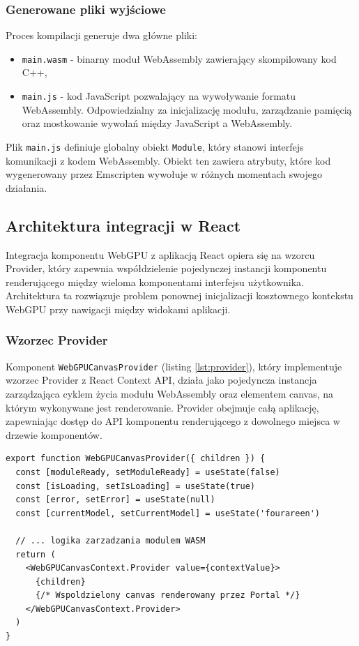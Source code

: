\subsubsection{Generowane pliki wyjściowe}

Proces kompilacji generuje dwa główne pliki:

\begin{itemize}
  \item \texttt{main.wasm} - binarny moduł WebAssembly zawierający skompilowany kod C++,
  \item \texttt{main.js} - kod JavaScript pozwalający na wywoływanie formatu WebAssembly. Odpowiedzialny za inicjalizację modułu, zarządzanie pamięcią oraz mostkowanie wywołań między JavaScript a WebAssembly.
\end{itemize}

Plik \texttt{main.js} definiuje globalny obiekt \texttt{Module}, który stanowi interfejs komunikacji z kodem WebAssembly. Obiekt ten zawiera atrybuty, które kod wygenerowany przez Emscripten wywołuje w różnych momentach swojego działania.

\subsection{Architektura integracji w React}

Integracja komponentu WebGPU z aplikacją React opiera się na wzorcu Provider, który zapewnia współdzielenie pojedynczej instancji komponentu renderującego między wieloma komponentami interfejsu użytkownika. Architektura ta rozwiązuje problem ponownej inicjalizacji kosztownego kontekstu WebGPU przy nawigacji między widokami aplikacji.

\subsubsection{Wzorzec Provider}

Komponent \texttt{WebGPUCanvasProvider} (listing \ref{lst:provider}), który implementuje wzorzec Provider z React Context API, działa jako pojedyncza instancja zarządzająca cyklem życia modułu WebAssembly oraz elementem canvas, na którym wykonywane jest renderowanie. Provider obejmuje całą aplikację, zapewniając dostęp do API komponentu renderującego z dowolnego miejsca w drzewie komponentów.

\begin{lstlisting}[style=javascript, caption={Struktura komponentu Provider}, label={lst:provider}]
export function WebGPUCanvasProvider({ children }) {
  const [moduleReady, setModuleReady] = useState(false)
  const [isLoading, setIsLoading] = useState(true)
  const [error, setError] = useState(null)
  const [currentModel, setCurrentModel] = useState('fourareen')

  // ... logika zarzadzania modulem WASM
  return (
    <WebGPUCanvasContext.Provider value={contextValue}>
      {children}
      {/* Wspoldzielony canvas renderowany przez Portal */}
    </WebGPUCanvasContext.Provider>
  )
}
\end{lstlisting}

